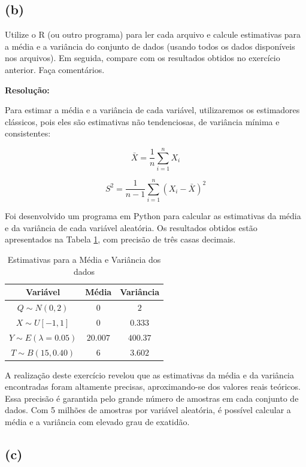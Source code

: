 \documentclass[a4paper, 11pt]{article}
\begin{document}
\subsection{\textbf{(b)}}

\noindent Utilize o R (ou outro programa) para ler cada arquivo e calcule estimativas para a
média e a variância do conjunto de dados (usando todos os dados disponíveis nos
arquivos). Em seguida, compare com os resultados obtidos no exercício anterior.
Faça comentários.

\textbf{Resolução:}

Para estimar a média e a variância de cada variável, utilizaremos os estimadores clássicos, pois eles são estimativas não tendenciosas, de variância mínima e consistentes:

\[
\bar{X} = \dfrac{1}{n} \sum_{i=1}^{n} X_i
\]

\[
S^2 = \dfrac{1}{n-1} \sum_{i=1}^{n} (X_i - \bar{X})^2
\]

Foi desenvolvido um programa em Python para calcular as estimativas da média e da variância de cada variável aleatória. Os resultados obtidos estão apresentados na Tabela \ref{tab:esti}, com precisão de três casas decimais.

\begin{table}[H]
    \centering
    \begin{tabular}{|c|c|c|}
        \hline
        \textbf{Variável} & \textbf{Média} & \textbf{Variância} \\
        \hline
        $Q \sim N(0, 2)$ & $ 0 $ & $2$ \\
        $X \sim U[-1, 1]$ & $0$ & $0.333$ \\
        $Y \sim E(\lambda = 0.05)$ & $20.007$ & $400.37$ \\
        $T \sim B(15, 0.40)$ & $6$ & $3.602$ \\
        \hline
    \end{tabular}
    \caption{Estimativas para a Média e Variância dos dados}
    \label{tab:esti}
\end{table}

A realização deste exercício revelou que as estimativas da média e da variância encontradas foram altamente precisas, aproximando-se dos valores reais teóricos. Essa precisão é garantida pelo grande número de amostras em cada conjunto de dados. Com 5 milhões de amostras por variável aleatória, é possível calcular a média e a variância com elevado grau de exatidão.

\subsection{\textbf{(c)}}
\end{document}
